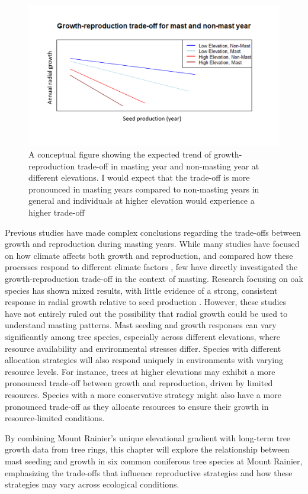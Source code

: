 \documentclass[11pt,letter]{article}
\begin{document}
\begin{figure}[htb]
	\centering
	\includegraphics[width=1\linewidth]{conceptualFigureChap2.png}
	\caption{A conceptual figure showing the expected trend of growth-reproduction trade-off in masting year and non-masting year at different elevations. I would expect that the trade-off is more pronounced in masting years compared to non-masting years in general and individuals at higher elevation would experience a higher trade-off}
	\label{fig:conceptual2}
\end{figure}
Previous studies have made complex conclusions regarding the trade-offs between growth and reproduction during masting years. While many studies have focused on how climate affects both growth and reproduction, and compared how these processes respond to different climate factors \citep{koenig2020can, bajocco2021characterizing, redmond2019resource, sanchez2011trade}, few have directly investigated the growth-reproduction trade-off in the context of masting. Research focusing on oak species has shown mixed results, with little evidence of a strong, consistent response in radial growth relative to seed production \citep{koenig2020can, patterson2023acorn}. However, these studies have not entirely ruled out the possibility that radial growth could be used to understand masting patterns. Mast seeding and growth responses can vary significantly among tree species, especially across different elevations, where resource availability and environmental stresses differ. Species with different allocation strategies will also respond uniquely in environments with varying resource levels. For instance, trees at higher elevations may exhibit a more pronounced trade-off between growth and reproduction, driven by limited resources. Species with a more conservative strategy might also have a more pronounced trade-off as they allocate resources to ensure their growth in resource-limited conditions.\par
By combining Mount Rainier's unique elevational gradient with long-term tree growth data from tree rings, this chapter will explore the relationship between mast seeding and growth in six common coniferous tree species at Mount Rainier, emphasizing the trade-offs that influence reproductive strategies and how these strategies may vary across ecological conditions.\par
\end{document}
